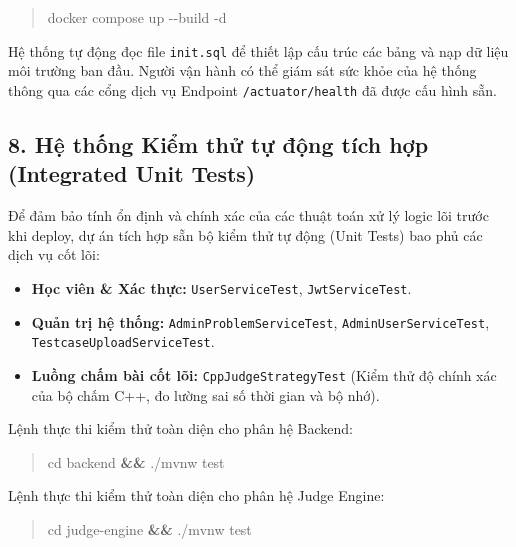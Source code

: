 \documentclass[12pt,a4paper]{article}
\renewcommand{\_}{\BreakableUnderscore}
\newenvironment{Shaded}{\vspace{3pt}\begin{quote}}{\end{quote}\vspace{3pt}}
\newcommand{\AttributeTok}[1]{\textcolor[rgb]{0.49,0.56,0.16}{#1}}
\newcommand{\BuiltInTok}[1]{\textcolor[rgb]{0.00,0.50,0.00}{#1}}
\newcommand{\ExtensionTok}[1]{#1}
\newcommand{\KeywordTok}[1]{\textcolor[rgb]{0.00,0.44,0.13}{\textbf{#1}}}
\newcommand{\NormalTok}[1]{#1}
\providecommand{\tightlist}{%
  \setlength{\itemsep}{0pt}\setlength{\parskip}{0pt}}
\begin{document}
\begin{Shaded}
\begin{Highlighting}[]
\ExtensionTok{docker}\NormalTok{ compose up }\AttributeTok{{-}{-}build} \AttributeTok{{-}d}
\end{Highlighting}
\end{Shaded}

Hệ thống tự động đọc file \texttt{init.sql} để thiết lập cấu trúc các bảng và nạp dữ liệu môi trường ban đầu. Người vận hành có thể giám sát sức khỏe của hệ thống thông qua các cổng dịch vụ Endpoint \texttt{/actuator/health} đã được cấu hình sẵn.

\subsection{8. Hệ thống Kiểm thử tự động tích hợp (Integrated Unit Tests)}

Để đảm bảo tính ổn định và chính xác của các thuật toán xử lý logic lõi trước khi deploy, dự án tích hợp sẵn bộ kiểm thử tự động (Unit Tests) bao phủ các dịch vụ cốt lõi:

\begin{itemize}
\tightlist
\item
  \textbf{Học viên \& Xác thực:} \texttt{UserServiceTest}, \texttt{JwtServiceTest}.
\item
  \textbf{Quản trị hệ thống:} \texttt{AdminProblemServiceTest}, \texttt{AdminUserServiceTest}, \texttt{TestcaseUploadServiceTest}.
\item
  \textbf{Luồng chấm bài cốt lõi:} \texttt{CppJudgeStrategyTest} (Kiểm thử độ chính xác của bộ chấm C++, đo lường sai số thời gian và bộ nhớ).
\end{itemize}

Lệnh thực thi kiểm thử toàn diện cho phân hệ Backend:

\begin{Shaded}
\begin{Highlighting}[]
\BuiltInTok{cd}\NormalTok{ backend }\KeywordTok{\&\&} \ExtensionTok{./mvnw}\NormalTok{ test}
\end{Highlighting}
\end{Shaded}

Lệnh thực thi kiểm thử toàn diện cho phân hệ Judge Engine:

\begin{Shaded}
\begin{Highlighting}[]
\BuiltInTok{cd}\NormalTok{ judge{-}engine }\KeywordTok{\&\&} \ExtensionTok{./mvnw}\NormalTok{ test}
\end{Highlighting}
\end{Shaded}
\end{document}
